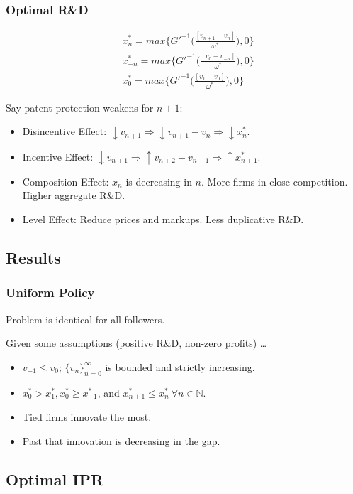 \documentclass{beamer}
\begin{document}
\begin{frame}[t]\frametitle{Optimal R\&D}
  \!\!\!\!\!\!\!\!\!\!\!\! %
  \begin{align} \label{eq:ss_rd_policies}
    &x_n^*    = max \big\{G'^{-1}\Bigg(\frac{[v_{n+1} - v_n]}{\omega^*}\Bigg)   ,0\}\\
    &x_{-n}^* = max \big\{G'^{-1}\Bigg(\frac{[v_0  - v_{-n}]}{\omega^*}\Bigg)   ,0\}\\
    &x_0^*    = max \big\{G'^{-1}\Bigg(\frac{[v_1     - v_0]}{\omega^*}\Bigg)   ,0\}
  \end{align}

  Say patent protection weakens for $n + 1$:
  \begin{itemize}
    \item<2-> Disincentive Effect: $\downarrow v_{n+1} \Rightarrow \downarrow v_{n+1} - v_n \Rightarrow \downarrow x_n^*$.
    \item<3-> Incentive Effect: $\downarrow v_{n+1} \Rightarrow \uparrow v_{n+2} - v_{n+1} \Rightarrow \uparrow x_{n+1}^*$.
    \item<4-> Composition Effect: $x_n$ is decreasing in $n$. More firms in close competition. Higher aggregate R\&D.
    \item<5-> Level Effect: Reduce prices and markups.  Less duplicative R\&D.
  \end{itemize}
\end{frame}

\subsection{Results}
\label{sub:results}
\begin{frame}[t]\frametitle{Uniform Policy} 
Problem is identical for all followers.

Given some assumptions (positive R\&D, non-zero profits) \ldots
\begin{itemize}
  \item<+-> $v_{-1} \leq v_0$; $\{v_n\}_{n=0}^{\infty}$ is bounded and strictly increasing.
  \item<+-> $x_0^* > x_1^*, x_0^* \geq x_{-1}^*$, and $x_{n+1}^* \leq x_n^*\ \forall n \in \mathbb{N}$.
  \item<2> Tied firms innovate the most.
  \item<2> Past that innovation is decreasing in the gap.
\end{itemize}
\end{frame}

\subsection{Optimal IPR}
\label{sub:optimal_ipr}
\end{document}
